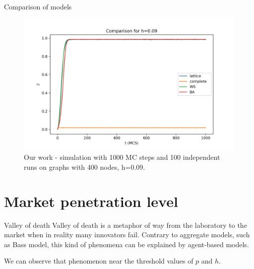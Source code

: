 \documentclass[10pt]{beamer}
\begin{document}
\begin{frame}{Comparison of models}
	\begin{figure}
		\includegraphics[width=\textwidth]{../results/images/comparison_with_lattice.jpg}
		\caption{Our work - simulation with 1000 MC steps and 100 independent runs on graphs with 400 nodes, h=0.09. }
	\end{figure}
\end{frame}

\section{Market penetration level}

\begin{frame}{Valley of death}
	Valley of death is a metaphor of way from the laboratory to the market when in reality many innovators fail. Contrary to aggregate models, such as Bass model, this kind of phenomena can be explained by agent-based models.
	
	We can observe that phenomenon near the threshold values of $p$ and $h$.
\end{frame}
\end{document}
